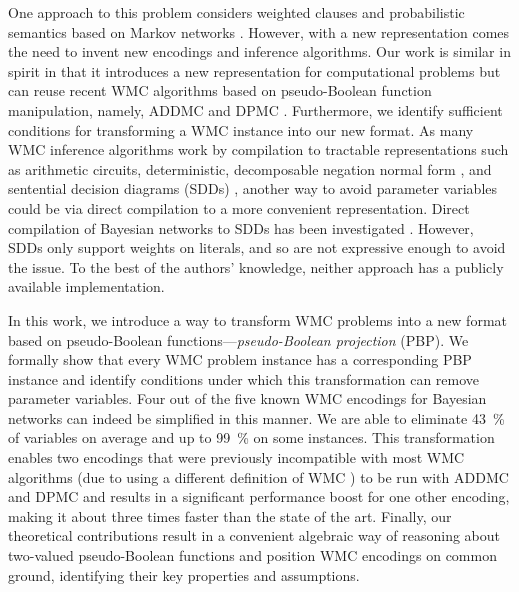 One approach to this problem considers weighted clauses and probabilistic
semantics based on Markov networks \citep{DBLP:conf/uai/GogateD10}. However, with
a new representation comes the need to invent new encodings and inference
algorithms. Our work is similar in spirit in that it introduces a new
representation for computational problems but can reuse recent WMC algorithms
based on pseudo-Boolean function manipulation, namely, \textsf{ADDMC}
\citep{DBLP:conf/aaai/DudekPV20} and \textsf{DPMC} \citep{DBLP:conf/cp/DudekPV20}.
Furthermore, we identify sufficient conditions for transforming a WMC instance
into our new format. As many WMC inference algorithms
\citep{DBLP:conf/ecai/Darwiche04,DBLP:conf/ijcai/OztokD15} work by compilation to
tractable representations such as arithmetic circuits, deterministic,
decomposable negation normal form \citep{DBLP:journals/jancl/Darwiche01}, and
sentential decision diagrams (SDDs) \citep{DBLP:conf/ijcai/Darwiche11}, another
way to avoid parameter variables could be via direct compilation to a more
convenient representation. Direct compilation of Bayesian networks to SDDs has
been investigated \citep{DBLP:conf/ecsqaru/ChoiKD13}. However, SDDs only support
weights on literals, and so are not expressive enough to avoid the issue. To the
best of the authors' knowledge, neither approach
\citep{DBLP:conf/ecsqaru/ChoiKD13,DBLP:conf/uai/GogateD10} has a publicly
available implementation.

In this work, we introduce a way to transform WMC problems into a new format
based on pseudo-Boolean functions---\emph{pseudo-Boolean projection} (PBP). We
formally show that every WMC problem instance has a corresponding PBP instance
and identify conditions under which this transformation can remove parameter
variables. Four out of the five known WMC encodings for Bayesian networks
\citep{DBLP:conf/ecai/BartKLM16,DBLP:conf/ijcai/ChaviraD05,DBLP:conf/sat/ChaviraD06,DBLP:conf/kr/Darwiche02,DBLP:conf/aaai/SangBK05}
can indeed be simplified in this manner. We are able to eliminate
\SI{43}{\percent} of variables on average and up to \SI{99}{\percent} on some
instances. This transformation enables two encodings that were previously
incompatible with most WMC algorithms (due to using a different definition of
WMC \citep{DBLP:conf/ijcai/ChaviraD05,DBLP:conf/sat/ChaviraD06}) to be run with
\textsf{ADDMC} and \textsf{DPMC} and results in a significant performance boost
for one other encoding, making it about three times faster than the state of the
art. Finally, our theoretical contributions result in a convenient algebraic way
of reasoning about two-valued pseudo-Boolean functions and position WMC
encodings on common ground, identifying their key properties and assumptions.

